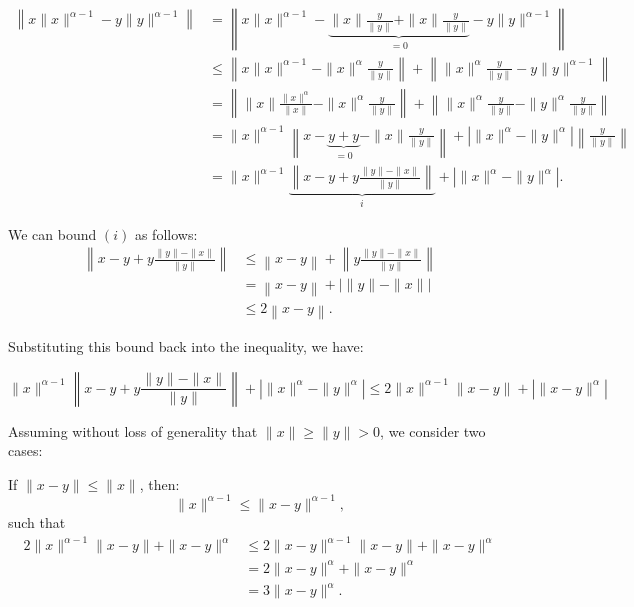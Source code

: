 \begin{equation*}
    \begin{aligned}
        \left\| x \|x\|^{\alpha - 1} - y \|y\|^{\alpha - 1} \right\| 
        &= \left\| x \|x\|^{\alpha - 1} - \underbrace{\|x\|\frac{y}{\|y\|} + \|x\|\frac{y}{\|y\|}}_{=0} - y \|y\|^{\alpha - 1} \right\| \\
        &\leq \left\| x \|x\|^{\alpha - 1} - \|x\|^\alpha \frac{y}{\|y\|} \right\| + \left\| \|x\|^\alpha \frac{y}{\|y\|} - y \|y\|^{\alpha - 1} \right\| \\
        &= \left\|\|x\| \frac{\|x\|^\alpha}{\|x\|} - \|x\|^\alpha \frac{y}{\|y\|} \right\| + \left\|\|x\|^\alpha \frac{y}{\|y\|} - \|y\|^\alpha \frac{y}{\|y\|} \right\| \\
        &= \|x\|^{\alpha - 1} \left\| x - \underbrace{y + y}_{=0} - \|x\| \frac{y}{\|y\|} \right\| + \left| \|x\|^\alpha - \|y\|^\alpha \right| \left\| \frac{y}{\|y\|} \right\| \\
        &= \|x\|^{\alpha - 1} \underbrace{\left\| x - y + y \frac{\|y\| - \|x\|}{\|y\|} \right\|}_{i} + \left| \|x\|^\alpha - \|y\|^\alpha \right|.
    \end{aligned}
\end{equation*}

We can bound \((i)\) as follows:
\begin{equation*}
    \begin{aligned}
        \left\| x - y + y \frac{\|y\| - \|x\|}{\|y\|} \right\| 
        &\leq \left\| x - y \right\| + \left\| y \frac{\|y\| - \|x\|}{\|y\|} \right\| \\
        &= \left\| x - y \right\| + \left| \|y\| - \|x\| \right| \\ 
        &\leq 2\left\| x - y \right\|.
    \end{aligned}
\end{equation*}

Substituting this bound back into the inequality, we have:

\begin{equation*}
        \|x\|^{\alpha - 1} \left\| x - y + y \frac{\|y\| - \|x\|}{\|y\|} \right\| + \left| \|x\|^\alpha - \|y\|^\alpha \right| 
        \leq 2 \|x\|^{\alpha - 1} \|x - y\| + \left| \|x - y\|^\alpha \right| 
\end{equation*}

Assuming without loss of generality that \(\|x\| \geq \|y\| > 0\), we consider two cases:

If \(\|x-y\| \leq \|x\|\), then:
\begin{equation*}
    \|x\|^{\alpha - 1}  \leq \|x-y\|^{\alpha - 1},
\end{equation*}
such that 
\begin{equation*}
    \begin{aligned}
        2 \|x\|^{\alpha - 1} \|x - y\| + \|x - y\|^\alpha 
        &\leq 2 \|x-y\|^{\alpha - 1} \|x - y\| + \|x - y\|^\alpha  \\
        &= 2 \|x-y\|^{\alpha} + \|x - y\|^\alpha \\
        &= 3 \|x-y\|^{\alpha}.
    \end{aligned}
\end{equation*}

